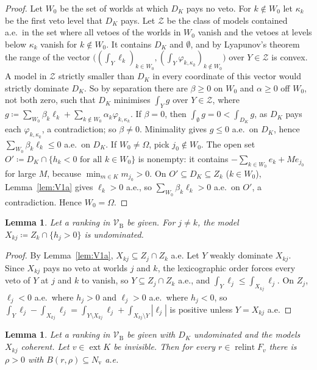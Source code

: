 \documentclass[11pt]{article}
\newcommand{\VBB}{\mathcal{V}_{\mathrm B}}
\DeclareMathOperator{\relint}{relint}
\DeclareMathOperator{\ext}{ext}
\theoremstyle{plain}
\newtheorem{lemma}[theorem]{Lemma}
\theoremstyle{definition}
\theoremstyle{remark}
\begin{document}
\begin{proof}
Let $W_0$ be the set of worlds at which $D_K$ pays no veto. For $k\notin W_0$ let
$\kappa_k$ be the first veto level that $D_K$ pays. Let $\mathcal Z$ be the class of
models contained a.e.\ in the set where all vetoes of the worlds in $W_0$ vanish and the
vetoes at levels below $\kappa_k$ vanish for $k\notin W_0$. It contains $D_K$ and
$\emptyset$, and by Lyapunov's theorem the range of the vector
$\bigl((\int_Y\ell_k)_{k\in W_0},(\int_Y\varphi_{k,\kappa_k})_{k\notin W_0}\bigr)$ over
$Y\in\mathcal Z$ is convex. A model in $\mathcal Z$ strictly smaller than $D_K$ in every
coordinate of this vector would strictly dominate $D_K$. So by separation there are
$\beta\ge0$ on $W_0$ and $\alpha\ge0$ off $W_0$, not both zero, such that $D_K$ minimises
$\int_Yg$ over $Y\in\mathcal Z$, where $g\coloneqq\sum_{W_0}\beta_k\ell_k+\sum_{k\notin W_0}
\alpha_k\varphi_{k,\kappa_k}$. If $\beta=0$, then $\int_\emptyset g=0<\int_{D_K}g$, as
$D_K$ pays each $\varphi_{k,\kappa_k}$, a contradiction; so $\beta\neq0$. Minimality gives
$g\le0$ a.e.\ on $D_K$, hence $\sum_{W_0}\beta_k\ell_k\le0$ a.e.\ on $D_K$. If
$W_0\ne\Omega$, pick $j_0\notin W_0$. The open set $O'\coloneqq D_K\cap\{h_k<0\text{ for
all }k\in W_0\}$ is nonempty: it contains $-\sum_{k\in W_0}e_k+Me_{j_0}$ for large $M$,
because $\min_{m\in K}m_{j_0}>0$. On $O'\subseteq D_K\subseteq Z_k$ ($k\in W_0$),
Lemma~\ref{lem:V1a} gives $\ell_k>0$ a.e., so $\sum_{W_0}\beta_k\ell_k>0$ a.e.\ on $O'$,
a contradiction. Hence $W_0=\Omega$.
\end{proof}

\begin{lemma}\label{lem:V3}
Let a ranking in $\VBB$ be given. For $j\ne k$, the model $X_{kj}\coloneqq Z_k\cap
\{h_j>0\}$ is undominated.
\end{lemma}

\begin{proof}
By Lemma~\ref{lem:V1a}, $X_{kj}\subseteq Z_j\cap Z_k$ a.e. Let $Y$ weakly dominate
$X_{kj}$. Since $X_{kj}$ pays no veto at worlds $j$ and $k$, the lexicographic order forces
every veto of $Y$ at $j$ and $k$ to vanish, so $Y\subseteq Z_j\cap Z_k$ a.e., and
$\int_Y\ell_j\le\int_{X_{kj}}\ell_j$. On $Z_j$, $\ell_j<0$ a.e.\ where $h_j>0$ and
$\ell_j>0$ a.e.\ where $h_j<0$, so
$\int_Y\ell_j-\int_{X_{kj}}\ell_j=\int_{Y\setminus X_{kj}}\ell_j+\int_{X_{kj}\setminus Y}
|\ell_j|$ is positive unless $Y=X_{kj}$ a.e.
\end{proof}

\begin{lemma}\label{lem:V4}
Let a ranking in $\VBB$ be given with $D_K$ undominated and the models $X_{kj}$
coherent. Let $v\in\ext K$ be invisible. Then for every $r\in\relint F_v$ there is
$\rho>0$ with $B(r,\rho)\subseteq N_{\mathrm v}$ a.e.
\end{lemma}
\end{document}
